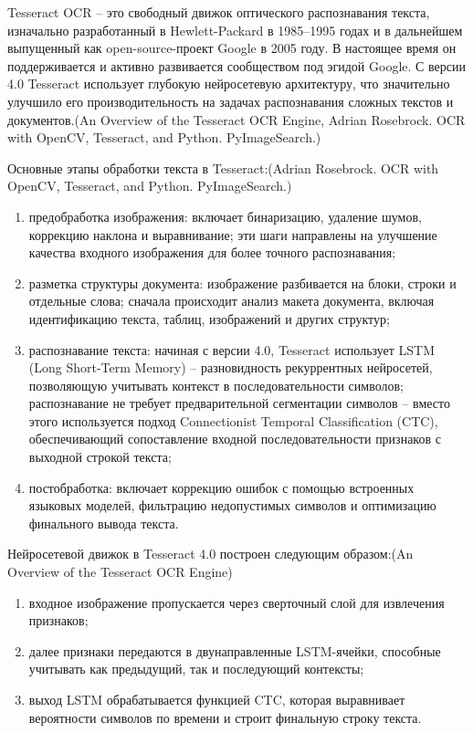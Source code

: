 Tesseract OCR -- это свободный движок оптического распознавания текста, 
изначально разработанный в Hewlett-Packard в 1985–1995 годах и в дальнейшем 
выпущенный как open-source-проект Google в 2005 году. В настоящее время он 
поддерживается и активно развивается сообществом под эгидой Google. С версии 4.0 
Tesseract использует глубокую нейросетевую архитектуру, что значительно улучшило 
его производительность на задачах распознавания сложных текстов и документов.(An Overview of the Tesseract OCR Engine, Adrian Rosebrock. OCR with OpenCV, Tesseract, and Python. PyImageSearch.)

Основные этапы обработки текста в Tesseract:(Adrian Rosebrock. OCR with OpenCV, Tesseract, and Python. PyImageSearch.)

\begin{enumerate}
    \item предобработка изображения: включает бинаризацию, удаление шумов, 
    коррекцию наклона и выравнивание; эти шаги направлены на улучшение качества 
    входного изображения для более точного распознавания;
    \item разметка структуры документа: изображение разбивается на блоки, строки 
    и отдельные слова; сначала происходит анализ макета документа, включая 
    идентификацию текста, таблиц, изображений и других структур;
    \item распознавание текста: начиная с версии 4.0, Tesseract использует LSTM 
    (Long Short-Term Memory) -- разновидность рекуррентных нейросетей, 
    позволяющую учитывать контекст в последовательности символов; распознавание 
    не требует предварительной сегментации символов -- вместо этого используется 
    подход Connectionist Temporal Classification (CTC), обеспечивающий 
    сопоставление входной последовательности признаков с выходной строкой текста;
    \item постобработка: включает коррекцию ошибок с помощью встроенных языковых 
    моделей, фильтрацию недопустимых символов и оптимизацию финального вывода 
    текста.
\end{enumerate}

Нейросетевой движок в Tesseract 4.0 построен следующим образом:(An Overview of the Tesseract OCR Engine)

\begin{enumerate}
    \item входное изображение пропускается через сверточный слой для извлечения 
    признаков;
    \item далее признаки передаются в двунаправленные LSTM-ячейки, способные 
    учитывать как предыдущий, так и последующий контексты;
    \item выход LSTM обрабатывается функцией CTC, которая выравнивает вероятности 
    символов по времени и строит финальную строку текста.
\end{enumerate}

